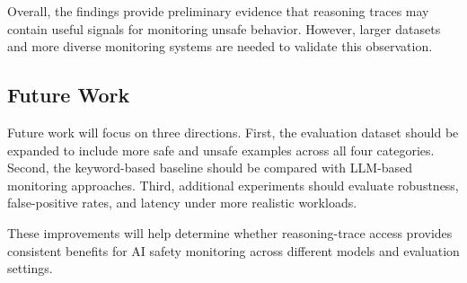 Overall, the findings provide preliminary evidence
that reasoning traces may contain useful signals
for monitoring unsafe behavior. However, larger
datasets and more diverse monitoring systems are
needed to validate this observation.

\subsection{Future Work}

Future work will focus on three directions. First,
the evaluation dataset should be expanded to include
more safe and unsafe examples across all four
categories. Second, the keyword-based baseline
should be compared with LLM-based monitoring
approaches. Third, additional experiments should
evaluate robustness, false-positive rates, and
latency under more realistic workloads.

These improvements will help determine whether
reasoning-trace access provides consistent benefits
for AI safety monitoring across different models
and evaluation settings.
